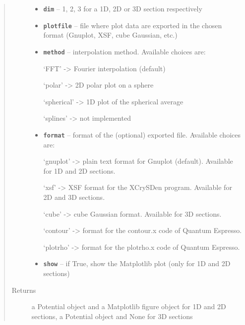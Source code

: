 \documentclass[letterpaper,10pt,english]{sphinxmanual}
\begin{document}
\begin{fulllineitems}
\begin{quote}
\begin{description}
\begin{itemize}
\item {} 
\textbf{\texttt{dim}} -- 1, 2, 3 for a 1D, 2D or 3D section respectively

\item {} 
\textbf{\texttt{plotfile}} -- file where plot data are exported in the chosen format (Gnuplot, XSF, cube Gaussian, etc.)

\item {} 
\textbf{\texttt{method}} -- 
interpolation method. Available choices are:

`FFT' -\textgreater{} Fourier interpolation (default)

`polar' -\textgreater{} 2D polar plot on a sphere

`spherical' -\textgreater{} 1D plot of the spherical average

`splines' -\textgreater{} not implemented


\item {} 
\textbf{\texttt{format}} -- 
format of the (optional) exported file. Available choices are:

`gnuplot' -\textgreater{} plain text format for Gnuplot (default). Available for 1D and 2D sections.

`xsf' -\textgreater{} XSF format for the XCrySDen program. Available for 2D and 3D sections.

`cube' -\textgreater{} cube Gaussian format. Available for 3D sections.

`contour' -\textgreater{} format for the contour.x code of Quantum Espresso.

`plotrho' -\textgreater{} format for the plotrho.x code of Quantum Espresso.


\item {} 
\textbf{\texttt{show}} -- if True, show the Matplotlib plot (only for 1D and 2D sections)

\end{itemize}

\item[{Returns}] \leavevmode
a Potential object and a Matplotlib figure object for 1D and 2D sections,
a Potential object and None for 3D sections

\end{description}\end{quote}

\end{fulllineitems}

\end{document}
